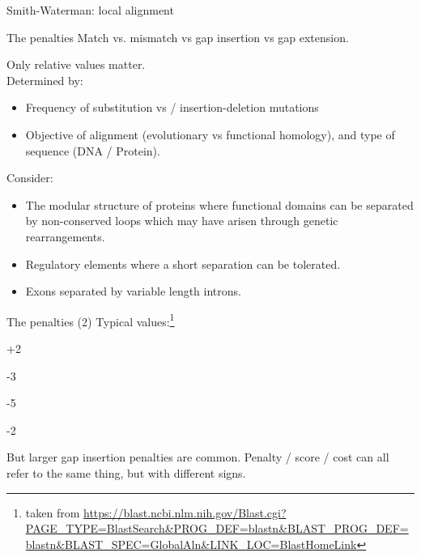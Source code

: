 \documentclass[pdf]{beamer}
\begin{document}
\begin{frame}{Smith-Waterman: local alignment}
  \begin{figure}[ht]
    \begin{tikzpicture}[scale=0.5]
      
    \end{tikzpicture}
  \end{figure}
\end{frame}

\begin{frame}{The penalties}
  Match vs. mismatch vs gap insertion vs gap extension.
  
  Only relative values matter.\\ 
  Determined by:
  
  \begin{itemize}
  \item Frequency of substitution vs / insertion-deletion mutations
  \item Objective of alignment (evolutionary vs functional homology),
  and type of sequence (DNA / Protein). 
  \end{itemize}

  \pause
  Consider:
  \begin{itemize}
  \item The modular structure of proteins where functional domains
    can be separated by non-conserved loops which may have arisen
    through genetic rearrangements.
  \item Regulatory elements where a short separation can be tolerated.
  \item Exons separated by variable length introns.
  \end{itemize}

\end{frame}

\begin{frame}{The penalties (2)}
  Typical values:\footnote{taken from \url{https://blast.ncbi.nlm.nih.gov/Blast.cgi?PAGE_TYPE=BlastSearch&PROG_DEF=blastn&BLAST_PROG_DEF=blastn&BLAST_SPEC=GlobalAln&LINK_LOC=BlastHomeLink}}
  \begin{description}
  \item[Match] +2
  \item[Mismatch] -3
  \item[Gap Insertion] -5
  \item[Gap Extension] -2
  \end{description}

  But larger gap insertion penalties are common.
  \vspace{0.2cm}
  Penalty / score / cost can all refer to the same thing, but with different signs.
  
\end{frame}
\end{document}
